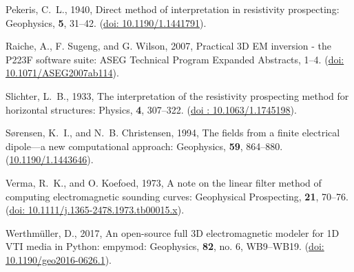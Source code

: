 \documentclass[paper,twocolumn,twoside]{geophysics}
\begin{document}
\begin{thebibliography}{}
Pekeris, C.~L.,  1940, Direct method of interpretation in resistivity
  prospecting: Geophysics, {\bf 5}, 31--42.
\newblock (\href{https://doi.org/10.1190/1.1441791}{doi: 10.1190/1.1441791}).

Raiche, A., F. Sugeng, and G. Wilson,  2007, Practical {3D} {EM} inversion -
  the {P223F} software suite: ASEG Technical Program Expanded Abstracts,  1--4.
\newblock (\href{http://doi.org/10.1071/ASEG2007ab114}{doi:
  10.1071/ASEG2007ab114}).

Slichter, L.~B.,  1933, The interpretation of the resistivity prospecting
  method for horizontal structures: Physics, {\bf 4}, 307--322.
\newblock (\href{http://doi.org/10.1063/1.1745198}{doi : 10.1063/1.1745198}).

Sørensen, K.~I., and N.~B. Christensen,  1994, The fields from a finite
  electrical dipole—a new computational approach: Geophysics, {\bf 59},
  864--880.
\newblock (\href{https://doi.org/10.1190/1.1443646}{10.1190/1.1443646}).

Verma, R.~K., and O. Koefoed,  1973, A note on the linear filter method of
  computing electromagnetic sounding curves: Geophysical Prospecting, {\bf 21},
  70--76.
\newblock (\href{http://doi.org/10.1111/j.1365-2478.1973.tb00015.x}{doi:
  10.1111/j.1365-2478.1973.tb00015.x}).

Werthmüller, D.,  2017, An open-source full {3D} electromagnetic modeler for
  {1D} {VTI} media in {P}ython: empymod: Geophysics, {\bf 82}, no. 6,
  WB9--WB19.
\newblock (\href{http://doi.org/10.1190/geo2016-0626.1}{doi:
  10.1190/geo2016-0626.1}).

\end{thebibliography}
\end{document}
